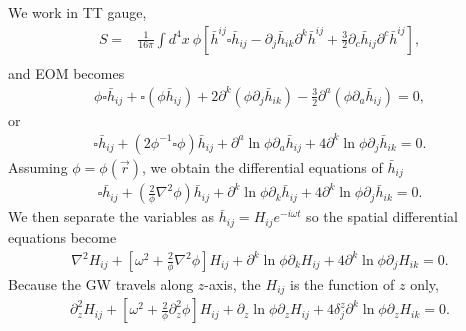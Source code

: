 \documentclass[
    jor,
    amsmath,amssymb,preprint,
    superscriptaddress,
]{revtex4-2}
\begin{document}
We work in TT gauge,
\begin{equation}
\begin{aligned}
S = & \frac{1}{16\pi } \int d^4x ~ \phi\left[ \bar{h}^{ij}\square \bar{h}_{ij} - \partial_j \bar{h}_{ik}\partial^k \bar{h}^{ij} + \frac{3}{2}\partial_c \bar{h}_{ij}\partial^c \bar{h}^{ij} \right], \\
\end{aligned}
\end{equation}
and EOM becomes
\begin{equation}
\begin{aligned}
\phi\square \bar{h}_{ij} + \square (\phi \bar{h}_{ij}) + 2\partial^k(\phi\partial_j \bar{h}_{ik}) - \frac{3}{2}\partial^a (\phi \partial_a \bar{h}_{ij}) = 0,
\end{aligned}
\end{equation}
or
\begin{equation}
\begin{aligned}
\square \bar{h}_{ij} + \left(2\phi^{-1}\square \phi \right)\bar{h}_{ij} + \partial^a \ln\phi \partial_a\bar{h}_{ij} + 4\partial^k \ln\phi\partial_j \bar{h}_{ik} = 0.
\end{aligned}
\end{equation}
Assuming $\phi = \phi(\vec{r})$, we obtain the differential equations of $\bar{h}_{ij}$
\begin{equation}
\begin{aligned}
\square \bar{h}_{ij} + \left(\frac{2}{\phi}\nabla^2 \phi\right) \bar{h}_{ij} + \partial^k \ln\phi \partial_k \bar{h}_{ij} + 4\partial^k \ln\phi\partial_j \bar{h}_{ik} = 0.
\end{aligned}
\end{equation}
We then separate the variables as $\bar{h}_{ij} = H_{ij}e^{-i\omega t}$ so the spatial differential equations become
\begin{equation}
\begin{aligned}
\nabla^2H_{ij} + \left[ \omega^2 + \frac{2}{\phi}\nabla^2 \phi\right]H_{ij} + \partial^k \ln\phi \partial_k H_{ij} + 4\partial^k \ln\phi\partial_j H_{ik} = 0.
\end{aligned}
\end{equation}
Because the GW travels along $z$-axis, the $H_{ij}$ is the function of $z$ only,
\begin{equation}
\begin{aligned}
    \partial_z^2 H_{ij} + \left[ \omega^2 + \frac{2}{\phi}\partial_z^2 \phi \right]H_{ij} + \partial_z \ln\phi \partial_z H_{ij} + 4\delta^z_j\partial^k \ln\phi\partial_z H_{ik} = 0.
\end{aligned}
\end{equation}
\end{document}

